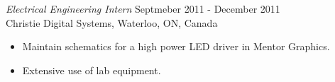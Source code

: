 \documentclass[margin, 10pt]{res} %
\begin{document}
\begin{resume}

{\sl Electrical Engineering Intern} \hfill Septmeber 2011 - December 2011\\
Christie Digital Systems, Waterloo, ON, Canada
\begin{itemize} 
\item Maintain schematics for a high power LED driver in Mentor Graphics.
\item Extensive use of lab equipment.
\end{itemize} 








\end{resume}
\end{document}
